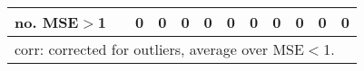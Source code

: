 {{\begin{sidewaystable}
\begin{tabular}{cc cc | cccc | cccc}
no. MSE$>$1 && 0 & 0 & 0 & 0 & 0 & 0 &0 & 0 & 0 & 0 \\[1ex] 
\hline 
\multicolumn{12}{l}{\footnotesize{corr: corrected for outliers, average over MSE$<$1.}}  \\ 
\end{tabular}
\label{tab:garch11_pcp_var}  
\end{sidewaystable}
}
}